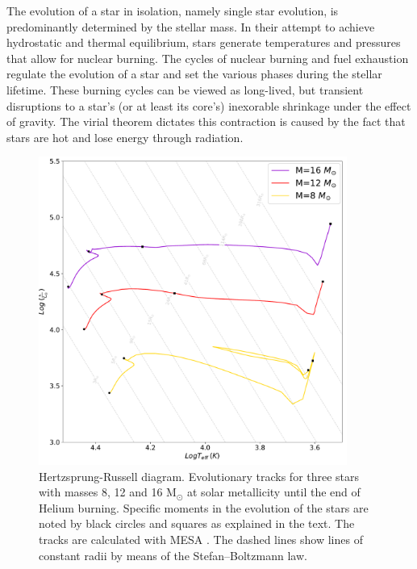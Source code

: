 The evolution of a star in isolation, namely single star evolution, is predominantly determined by the stellar mass. In their attempt to achieve hydrostatic and thermal equilibrium, stars generate temperatures and pressures that allow for nuclear burning. The cycles of nuclear burning and fuel exhaustion regulate the evolution of a star and set the various phases during the stellar lifetime. These burning cycles can be viewed as long-lived, but transient disruptions to a star's (or at least its core's) inexorable shrinkage under the effect of gravity. The virial theorem dictates this contraction is caused by the fact that stars are hot and lose energy through radiation. 
\begin{figure}[H]
    \centering
    \includegraphics[width=0.9\textwidth]{Thesis/graphs/HR_massive_stars.pdf}
    \caption{Hertzsprung-Russell diagram. Evolutionary tracks for three stars with masses 8, 12 and 16 M$_{\odot}$ at solar metallicity until the end of Helium burning. Specific moments in the evolution of the stars are noted by black circles and squares as explained in the text. The tracks are calculated with MESA \citep{paxton2010modules,paxton2013modules,paxton2015modules,paxton2019modules}. The dashed lines show lines of constant radii by means of the Stefan–Boltzmann law.}
    \label{fig:HR_massive_stars}
\end{figure}
